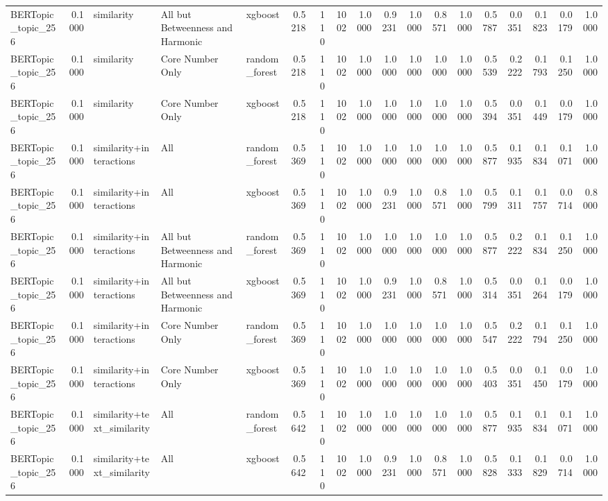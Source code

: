 \begin{tabular}{lrlllrrrrrrrrrrrrr}
BERTopic_topic_256 & 0.1000 & similarity & All but Betweenness and Harmonic & xgboost & 0.5218 & 110 & 1002 & 1.0000 & 0.9231 & 1.0000 & 0.8571 & 1.0000 & 0.5787 & 0.0351 & 0.1823 & 0.0179 & 1.0000 \\
BERTopic_topic_256 & 0.1000 & similarity & Core Number Only & random_forest & 0.5218 & 110 & 1002 & 1.0000 & 1.0000 & 1.0000 & 1.0000 & 1.0000 & 0.5539 & 0.2222 & 0.1793 & 0.1250 & 1.0000 \\
BERTopic_topic_256 & 0.1000 & similarity & Core Number Only & xgboost & 0.5218 & 110 & 1002 & 1.0000 & 1.0000 & 1.0000 & 1.0000 & 1.0000 & 0.5394 & 0.0351 & 0.1449 & 0.0179 & 1.0000 \\
BERTopic_topic_256 & 0.1000 & similarity+interactions & All & random_forest & 0.5369 & 110 & 1002 & 1.0000 & 1.0000 & 1.0000 & 1.0000 & 1.0000 & 0.5877 & 0.1935 & 0.1834 & 0.1071 & 1.0000 \\
BERTopic_topic_256 & 0.1000 & similarity+interactions & All & xgboost & 0.5369 & 110 & 1002 & 1.0000 & 0.9231 & 1.0000 & 0.8571 & 1.0000 & 0.5799 & 0.1311 & 0.1757 & 0.0714 & 0.8000 \\
BERTopic_topic_256 & 0.1000 & similarity+interactions & All but Betweenness and Harmonic & random_forest & 0.5369 & 110 & 1002 & 1.0000 & 1.0000 & 1.0000 & 1.0000 & 1.0000 & 0.5877 & 0.2222 & 0.1834 & 0.1250 & 1.0000 \\
BERTopic_topic_256 & 0.1000 & similarity+interactions & All but Betweenness and Harmonic & xgboost & 0.5369 & 110 & 1002 & 1.0000 & 0.9231 & 1.0000 & 0.8571 & 1.0000 & 0.5314 & 0.0351 & 0.1264 & 0.0179 & 1.0000 \\
BERTopic_topic_256 & 0.1000 & similarity+interactions & Core Number Only & random_forest & 0.5369 & 110 & 1002 & 1.0000 & 1.0000 & 1.0000 & 1.0000 & 1.0000 & 0.5547 & 0.2222 & 0.1794 & 0.1250 & 1.0000 \\
BERTopic_topic_256 & 0.1000 & similarity+interactions & Core Number Only & xgboost & 0.5369 & 110 & 1002 & 1.0000 & 1.0000 & 1.0000 & 1.0000 & 1.0000 & 0.5403 & 0.0351 & 0.1450 & 0.0179 & 1.0000 \\
BERTopic_topic_256 & 0.1000 & similarity+text_similarity & All & random_forest & 0.5642 & 110 & 1002 & 1.0000 & 1.0000 & 1.0000 & 1.0000 & 1.0000 & 0.5877 & 0.1935 & 0.1834 & 0.1071 & 1.0000 \\
BERTopic_topic_256 & 0.1000 & similarity+text_similarity & All & xgboost & 0.5642 & 110 & 1002 & 1.0000 & 0.9231 & 1.0000 & 0.8571 & 1.0000 & 0.5828 & 0.1333 & 0.1829 & 0.0714 & 1.0000 \\

\end{tabular}

